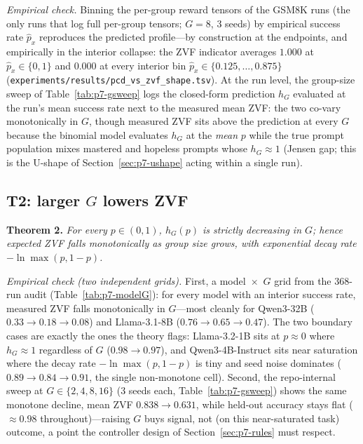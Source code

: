 \emph{Empirical check.} Binning the per-group reward tensors of the GSM8K
runs (the only runs that log full per-group tensors; $G = 8$, 3 seeds) by
empirical success rate $\hat p_x$ reproduces the predicted profile---by
construction at the endpoints, and empirically in the interior collapse: the
ZVF indicator averages
$1.000$ at $\hat p_x \in \{0, 1\}$ and $0.000$ at every interior bin
$\hat p_x \in \{0.125, \dots, 0.875\}$
(\texttt{experiments/results/pcd_vs_zvf_shape.tsv}). At the run level, the
group-size sweep of Table~\ref{tab:p7-gsweep} logs the closed-form prediction
$h_G$ evaluated at the run's mean success rate next to the measured mean ZVF:
the two co-vary monotonically in $G$, though measured ZVF sits above the
prediction at every $G$ because the binomial model evaluates $h_G$ at the
\emph{mean} $p$ while the true prompt population mixes mastered and hopeless
prompts whose $h_G \approx 1$ (Jensen gap; this is the U-shape of
Section~\ref{sec:p7-ushape} acting within a single run).

\subsection{T2: larger $G$ lowers ZVF}
\label{sec:p7-t2}
\textbf{Theorem 2.} \emph{For every $p \in (0,1)$, $h_G(p)$ is strictly
decreasing in $G$; hence expected ZVF falls monotonically as group size
grows, with exponential decay rate $-\ln\max(p, 1-p)$.}

\emph{Empirical check (two independent grids).} First, a model~$\times$~$G$
grid from the 368-run audit (Table~\ref{tab:p7-modelG}): for every model with
an interior success rate, measured ZVF falls monotonically in $G$---most
cleanly for Qwen3-32B ($0.33 \to 0.18 \to 0.08$) and Llama-3.1-8B
($0.76 \to 0.65 \to 0.47$). The two boundary cases are exactly the ones the
theory flags: Llama-3.2-1B sits at $p \approx 0$ where $h_G \approx 1$
regardless of $G$ ($0.98 \to 0.97$), and Qwen3-4B-Instruct sits near
saturation where the decay rate $-\ln\max(p,1-p)$ is tiny and seed noise
dominates ($0.89 \to 0.84 \to 0.91$, the single non-monotone cell). Second,
the repo-internal sweep at $G \in \{2,4,8,16\}$ (3 seeds each,
Table~\ref{tab:p7-gsweep}) shows the same monotone decline, mean ZVF
$0.838 \to 0.631$, while held-out accuracy stays flat ($\approx 0.98$
throughout)---raising $G$ buys signal, not (on this near-saturated task)
outcome, a point the controller design of Section~\ref{sec:p7-rules} must
respect.

